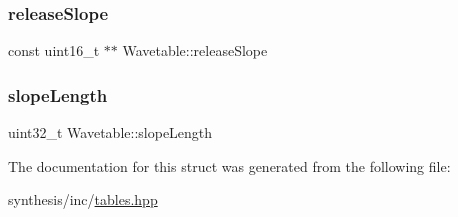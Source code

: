 \mbox{\label{struct_wavetable_ae48a196c95975321df7095d454ffe18e}} 
\subsubsection{\texorpdfstring{release\+Slope}{releaseSlope}}
{\footnotesize\ttfamily const uint16\+\_\+t $\ast$$\ast$ Wavetable\+::release\+Slope}

\mbox{\label{struct_wavetable_a59998c0be95e8630d258c4e0f7ba030e}} 
\subsubsection{\texorpdfstring{slope\+Length}{slopeLength}}
{\footnotesize\ttfamily uint32\+\_\+t Wavetable\+::slope\+Length}



The documentation for this struct was generated from the following file\+:\begin{DoxyCompactItemize}
\item 
synthesis/inc/\mbox{\hyperlink{inc_2tables_8hpp}{tables.\+hpp}}\end{DoxyCompactItemize}
